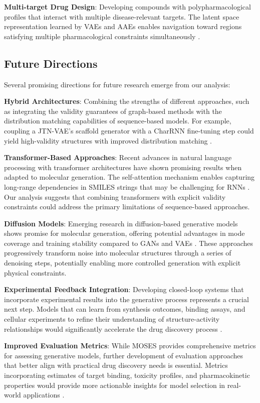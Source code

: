 \documentclass[conference]{IEEEtran}
\begin{document}
\textbf{Multi-target Drug Design}: Developing compounds with polypharmacological profiles that interact with multiple disease-relevant targets. The latent space representation learned by VAEs and AAEs enables navigation toward regions satisfying multiple pharmacological constraints simultaneously \cite{Jimenez-Luna2020, Sellwood2018}.

\subsection{Future Directions}
Several promising directions for future research emerge from our analysis:

\textbf{Hybrid Architectures}: Combining the strengths of different approaches, such as integrating the validity guarantees of graph-based methods with the distribution matching capabilities of sequence-based models. For example, coupling a JTN-VAE's scaffold generator with a CharRNN fine-tuning step could yield high-validity structures with improved distribution matching \cite{Atance2022}.

\textbf{Transformer-Based Approaches}: Recent advances in natural language processing with transformer architectures have shown promising results when adapted to molecular generation. The self-attention mechanism enables capturing long-range dependencies in SMILES strings that may be challenging for RNNs \cite{Thomas2022, Irwin2022}. Our analysis suggests that combining transformers with explicit validity constraints could address the primary limitations of sequence-based approaches.

\textbf{Diffusion Models}: Emerging research in diffusion-based generative models shows promise for molecular generation, offering potential advantages in mode coverage and training stability compared to GANs and VAEs \cite{Corso2022}. These approaches progressively transform noise into molecular structures through a series of denoising steps, potentially enabling more controlled generation with explicit physical constraints.

\textbf{Experimental Feedback Integration}: Developing closed-loop systems that incorporate experimental results into the generative process represents a crucial next step. Models that can learn from synthesis outcomes, binding assays, and cellular experiments to refine their understanding of structure-activity relationships would significantly accelerate the drug discovery process \cite{Coley2020}.

\textbf{Improved Evaluation Metrics}: While MOSES provides comprehensive metrics for assessing generative models, further development of evaluation approaches that better align with practical drug discovery needs is essential. Metrics incorporating estimates of target binding, toxicity profiles, and pharmacokinetic properties would provide more actionable insights for model selection in real-world applications \cite{Meyers2021}.
\end{document}
